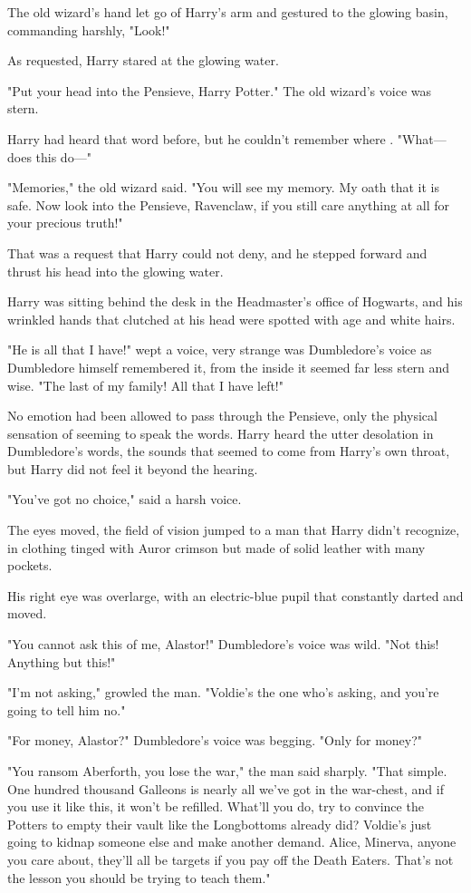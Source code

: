 The old wizard’s hand let go of Harry’s arm and gestured to the glowing basin,
commanding harshly, "Look!"

As requested, Harry stared at the glowing water.

"Put your head into the Pensieve, Harry Potter." The old wizard’s voice was
stern.

Harry had heard that word before, but he couldn’t remember where . "What—does
this do—"

"Memories," the old wizard said. "You will see my memory. My oath that it is
safe. Now look into the Pensieve, Ravenclaw, if you still care anything at all
for your precious truth!"

That was a request that Harry could not deny, and he stepped forward and thrust
his head into the glowing water.
\later
\begin{em}
Harry was sitting behind the desk in the Headmaster’s office of Hogwarts,
and his wrinkled hands that clutched at his head were spotted with age and
white hairs.

"He is all that I have!" wept a voice, very strange was Dumbledore’s
voice as Dumbledore himself remembered it, from the inside it seemed far less
stern and wise. "The last of my family! All that I have left!"

No emotion had been allowed to pass through the Pensieve, only the
physical sensation of seeming to speak the words. Harry heard the utter
desolation in Dumbledore’s words, the sounds that seemed to come from Harry’s
own throat, but Harry did not feel it beyond the hearing.

"You’ve got no choice," said a harsh voice.

The eyes moved, the field of vision jumped to a man that Harry didn’t
recognize, in clothing tinged with Auror crimson but made of solid leather with
many pockets.

His right eye was overlarge, with an electric-blue pupil that constantly
darted and moved.

"You cannot ask this of me, Alastor!" Dumbledore’s voice was wild. "Not
this! Anything but this!"

"I’m not asking," growled the man. "Voldie’s the one who’s asking, and
you’re going to tell him no."

"For money, Alastor?" Dumbledore’s voice was begging. "Only for money?"

"You ransom Aberforth, you lose the war," the man said sharply. "That
simple. One hundred thousand Galleons is nearly all we’ve got in the war-chest,
and if you use it like this, it won’t be refilled. What’ll you do, try to
convince the Potters to empty their vault like the Longbottoms already did?
Voldie’s just going to kidnap someone else and make another demand. Alice,
Minerva, anyone you care about, they’ll all be targets if you pay off the Death
Eaters. That’s not the lesson you should be trying to teach them."


\end{em}
